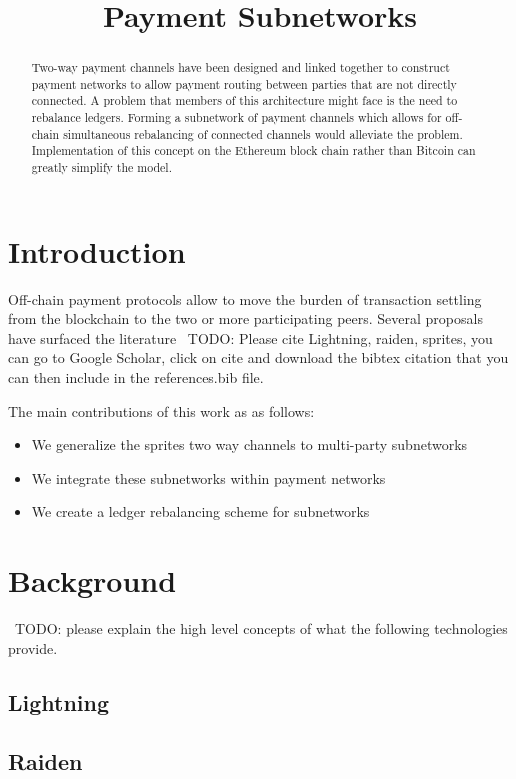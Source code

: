 \documentclass[12pt]{article}
\title{Payment Subnetworks\vspace{-5em}}
\date{}
\author{}
\newcommand{\todo}[1]{{\color{red}\ TODO: {#1}}}
\begin{document}
\maketitle
\begin{abstract}
Two-way payment channels have been designed and linked together to construct payment networks to allow payment routing between parties that are not directly connected. A problem that members of this architecture might face is the need to rebalance ledgers. Forming a subnetwork of payment channels which allows for off-chain simultaneous rebalancing of connected channels would alleviate the problem. Implementation of this concept on the Ethereum block chain rather than Bitcoin can greatly simplify the model.
\end{abstract}

\section{Introduction}
Off-chain payment protocols allow to move the burden of transaction settling from the blockchain to the two or more participating peers. Several proposals have surfaced the literature \todo{Please cite Lightning, raiden, sprites, you can go to Google Scholar, click on cite and download the bibtex citation that you can then include in the references.bib file}.

The main contributions of this work as as follows:

\begin{itemize}
	\item We generalize the sprites two way channels to multi-party subnetworks
	\item We integrate these subnetworks within payment networks
	\item We create a ledger rebalancing scheme for subnetworks
\end{itemize}

\section{Background}
\todo{please explain the high level concepts of what the following technologies provide.}
\subsection{Lightning}
\subsection{Raiden}
\end{document}
